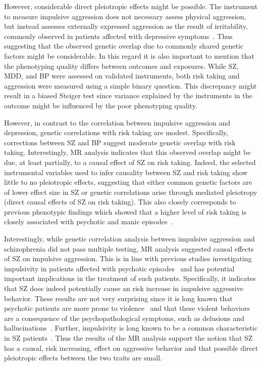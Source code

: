 However, considerable direct pleiotropic effects might be possible.
The  instrument to measure impulsive aggression does not necessary assess physical aggression, but instead assesses externally expressed aggression as the result of irritability,  commonly observed in patients affected with depressive symptoms~\cite{Dutton2013,Clark1994}.
Thus suggesting that the observed genetic overlap due to commonly shared genetic factors might be considerable.
In this regard it is also important to mention that the phenotyping quality differs between outcomes and exposures.
While SZ, MDD, and BP were assessed on validated instruments, both risk taking and aggression were measured using a simple binary question. 
This discrepancy might result in a biased Steiger test since variance explained by the instruments in the outcome might be influenced by the poor phenotyping quality. 

However, in contrast to the correlation between impulsive aggression and depression, genetic correlations with risk taking are modest.
Specifically, corrections between SZ and BP suggest moderate genetic overlap with risk taking.
Interestingly, MR analysis indicates that this observed overlap might be due, at least partially, to a causal effect of SZ on risk taking.
Indeed, the selected instrumental variables used to infer causality between SZ and risk taking show little to no pleiotropic effects,
 suggesting that either common genetic factors are of lower effect size in SZ or genetic correlations arise through mediated pleiotropy (direct causal effects of SZ on risk taking). 
This also closely corresponds to previous phenotypic findings which showed that a higher level of risk taking is closely associated with psychotic and manic episodes~\cite{Johnson2012,APA1994,AmericanPsychiatricAssociation2013}.

Interestingly, while genetic correlation analysis between impulsive aggression and schizophrenia did not pass multiple testing, MR analysis suggested causal effects of SZ on impulsive aggression. 
This is in line with previous studies investigating impulsivity in patients affected with psychotic episodes~\cite{Ouzir2013} and has potential important implications in the treatment of such patients.
Specifically, it indicates that SZ does indeed potentially cause an risk increase in impulsive aggressive behavior.
These results are not very surprising since it is long known that psychotic patients are more prone to violence~\cite{Douglas2009} and that these violent behaviors are a consequence of the psychopathological symptoms, such as delusions and hallucinations~\cite{Swanson2006}.
Further, impulsivity is long known to be a common characteristic in SZ patients~\cite{Ouzir2013}.
Thus the results of the MR analysis support the notion that SZ has a causal, risk increasing, effect on aggressive behavior and that possible direct pleiotropic effects between the two traits are small.

